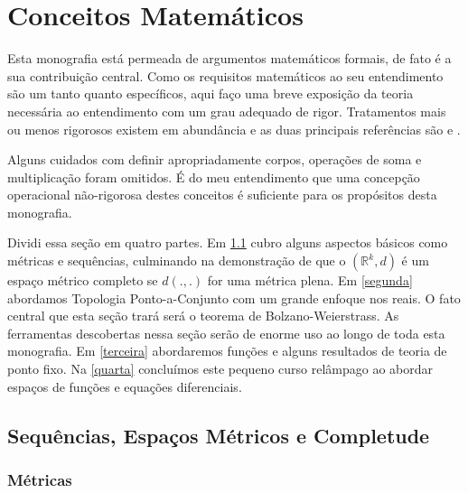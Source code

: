 

\chapter{Conceitos Matemáticos}
Esta monografia está permeada de argumentos matemáticos formais, de fato é a sua contribuição central. Como os requisitos matemáticos ao seu entendimento são um tanto quanto específicos, aqui faço uma breve exposição da teoria necessária ao entendimento com um grau adequado de rigor. Tratamentos mais ou menos rigorosos existem em abundância e as duas principais referências são \cite{rudin} e \cite{pugh}.

Alguns cuidados com definir apropriadamente corpos, operações de soma e multiplicação foram omitidos. É do meu entendimento que uma concepção operacional não-rigorosa destes conceitos é suficiente para os propósitos desta monografia.

Dividi essa seção em quatro partes. Em \ref{primeira} cubro alguns aspectos básicos como métricas e sequências, culminando na demonstração de que o $(\mathbb{R}^k, d)$ é um espaço métrico completo se $d(.,.)$ for uma métrica plena. Em \ref{segunda} abordamos Topologia Ponto-a-Conjunto com um grande enfoque nos reais. O fato central que esta seção trará será o teorema de Bolzano-Weierstrass. As ferramentas descobertas nessa seção serão de enorme uso ao longo de toda esta monografia. Em \ref{terceira} abordaremos funções e alguns resultados de teoria de ponto fixo. Na \ref{quarta} concluímos este pequeno curso relâmpago ao abordar espaços de funções e equações diferenciais.


\section{Sequências, Espaços Métricos e Completude}
\label{primeira}


\subsection{Métricas}

